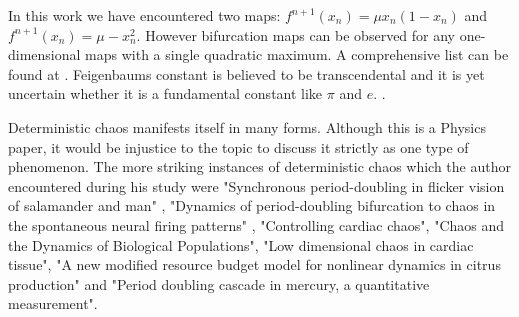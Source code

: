 In this work we have encountered two maps: $f^{n+1}(x_n)=\mu x_n (1-x_n)$ and $f^{n+1}(x_n)=\mu -  x_n^2$. However bifurcation maps
can be observed for any one-dimensional maps with a single quadratic maximum. A comprehensive list can be found at \cite{wikichaoslist}.
Feigenbaums constant is believed to be transcendental and it is yet uncertain whether it is a fundamental constant like $\pi$ and $e$.
\cite{constantofnature}.

Deterministic chaos manifests itself in many forms. Although this is a Physics paper, it would be injustice to the topic to discuss
it strictly as one type of phenomenon. The more striking instances of deterministic chaos which the author encountered during his study
were "Synchronous period-doubling in flicker vision of salamander 
and man" \cite{salamander}, "Dynamics of period-doubling bifurcation to chaos in the 
spontaneous neural firing patterns" \cite{neuralfiring}, "Controlling 
cardiac chaos"\cite{cardiacchaos}, "Chaos and the Dynamics of Biological Populations"\cite{populations},
"Low dimensional chaos in cardiac tissue"\cite{cardiacchaos2}, 
"A new modified resource budget model for nonlinear dynamics in citrus production"\cite{citrusproduction} 
and "Period doubling cascade in mercury, a quantitative measurement"\cite{mercury}.




